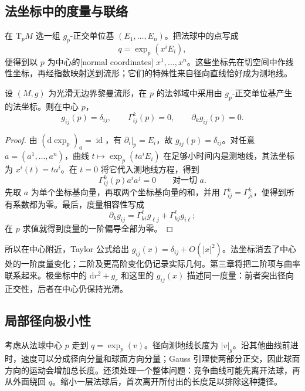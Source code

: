 \subsection{法坐标中的度量与联络}
\label{g3:subsec:0201:04}

在 \(\mathrm{T}_pM\) 选一组 \(g_p\)-正交单位基 \((E_1,\ldots,E_n)\)。把法球中的点写成
\[
	q=\exp_p(x^iE_i),
\]
便得到以 \(p\) 为中心的[normal coordinates] \(x^1,\ldots,x^n\)。这些坐标先在切空间中作线性坐标，再经指数映射送到流形；它们的特殊性来自径向直线恰好成为测地线。

\begin{proposition}\label{g3:prop:normal-coordinate-first-order}
	设 \((M,g)\) 为光滑无边界黎曼流形，在 \(p\) 的法邻域中采用由 \(g_p\)-正交单位基产生的法坐标。则在中心 \(p\)，
	\begin{equation}\label{g3:eq:normal-coordinate-first-order}
		g_{ij}(p)=\delta_{ij},\qquad
		\Gamma^k_{ij}(p)=0,\qquad
		\partial_k g_{ij}(p)=0.
	\end{equation}
\end{proposition}
\begin{proof}
	由 \((\mathrm{d}\exp_p)_0=\operatorname{id}\)，有 \(\partial_i|_p=E_i\)，故 \(g_{ij}(p)=\delta_{ij}\)。对任意 \(a=(a^1,\ldots,a^n)\)，曲线 \(t\mapsto\exp_p(ta^iE_i)\) 在足够小时间内是测地线，其法坐标为 \(x^i(t)=ta^i\)。在 \(t=0\) 将它代入测地线方程，得到
	\[
		\Gamma^k_{ij}(p)a^ia^j=0\qquad\text{对一切 }a.
	\]
	先取 \(a\) 为单个坐标基向量，再取两个坐标基向量的和，并用 \(\Gamma^k_{ij}=\Gamma^k_{ji}\)，便得到所有系数都为零。最后，度量相容性写成
	\[
		\partial_k g_{ij}
		=\Gamma^\ell_{ki}g_{\ell j}+\Gamma^\ell_{kj}g_{i\ell};
	\]
	在 \(p\) 求值就得到度量的一阶偏导全部为零。
\end{proof}

所以在中心附近，Taylor 公式给出 \(g_{ij}(x)=\delta_{ij}+O(|x|^2)\)。法坐标消去了中心处的一阶度量变化；二阶及更高阶变化仍记录实际几何。第三章将把二阶项与曲率联系起来。极坐标中的 \(\mathrm{d}r^2+g_r\) 和这里的 \(g_{ij}(x)\) 描述同一度量：前者突出径向正交性，后者在中心仍保持光滑。

\subsection{局部径向极小性}
\label{g3:subsec:0201:05}

考虑从法球中心 \(p\) 走到 \(q=\exp_p(v)\)。径向测地线长度为 \(|v|_g\)。沿其他曲线前进时，速度可以分成径向分量和球面方向分量；Gauss 引理使两部分正交，因此球面方向的运动会增加总长度。还须处理一个整体问题：竞争曲线可能先离开法球，再从外面绕回 \(q\)。缩小一层法球后，首次离开所付出的长度足以排除这种捷径。

